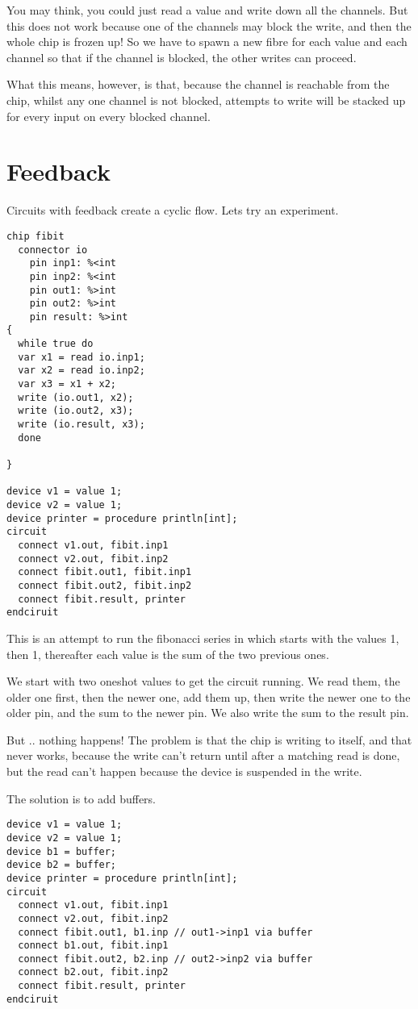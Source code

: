 \documentclass[oneside]{book}
\begin{document}
You may think, you could just read a value and write down all
the channels. But this does not work because one of the channels
may block the write, and then the whole chip is frozen up!
So we have to spawn a new fibre for each value and each channel
so that if the channel is blocked, the other writes can proceed.

What this means, however, is that, because the channel is reachable
from the chip, whilst any one channel is not blocked, attempts to write
will be stacked up for every input on every blocked channel. 

\section{Feedback}
Circuits with feedback create a cyclic flow. Lets try an experiment.

\begin{verbatim}
chip fibit 
  connector io
    pin inp1: %<int
    pin inp2: %<int
    pin out1: %>int
    pin out2: %>int
    pin result: %>int
{
  while true do
  var x1 = read io.inp1;
  var x2 = read io.inp2;
  var x3 = x1 + x2;
  write (io.out1, x2);
  write (io.out2, x3);
  write (io.result, x3);
  done

}

device v1 = value 1;
device v2 = value 1;
device printer = procedure println[int];
circuit
  connect v1.out, fibit.inp1
  connect v2.out, fibit.inp2
  connect fibit.out1, fibit.inp1
  connect fibit.out2, fibit.inp2
  connect fibit.result, printer
endciruit
\end{verbatim}

This is an attempt to run the fibonacci series in which starts with
the values 1, then 1, thereafter each value is the sum of the two
previous ones.

We start with two oneshot values to get the circuit running.
We read them, the older one first, then the newer one,
add them up, then write the newer one to the older pin,
and the sum to the newer pin. We also write the sum to the result pin.

But .. nothing happens! The problem is that the chip is writing
to itself, and that never works, because the write can't return
until after a matching read is done, but the read can't happen
because the device is suspended in the write.

The solution is to add buffers.

\begin{verbatim}
device v1 = value 1;
device v2 = value 1;
device b1 = buffer;
device b2 = buffer;
device printer = procedure println[int];
circuit
  connect v1.out, fibit.inp1
  connect v2.out, fibit.inp2
  connect fibit.out1, b1.inp // out1->inp1 via buffer
  connect b1.out, fibit.inp1
  connect fibit.out2, b2.inp // out2->inp2 via buffer
  connect b2.out, fibit.inp2
  connect fibit.result, printer
endciruit
\end{verbatim}
\end{document}
